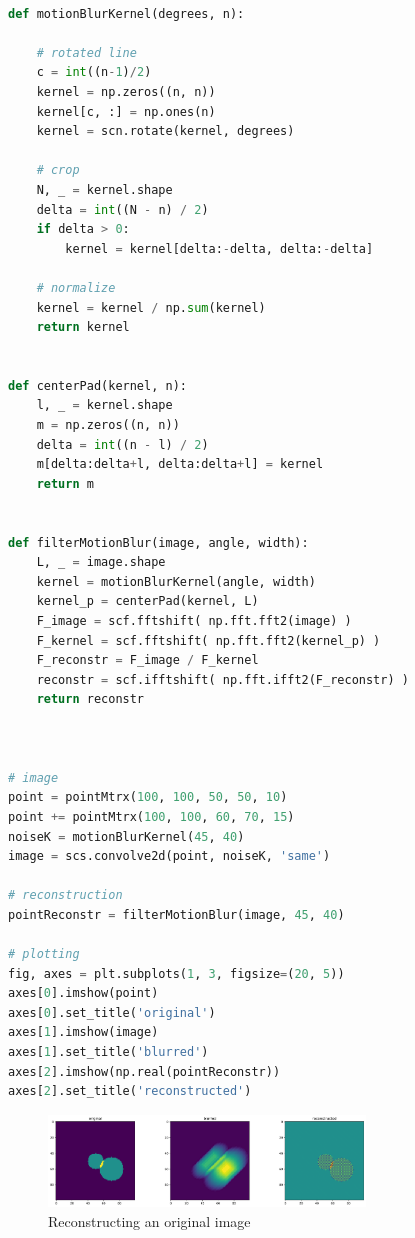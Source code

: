 \begin{lstlisting}[language=python]

def motionBlurKernel(degrees, n):

    # rotated line
    c = int((n-1)/2)
    kernel = np.zeros((n, n))
    kernel[c, :] = np.ones(n)
    kernel = scn.rotate(kernel, degrees)

    # crop
    N, _ = kernel.shape
    delta = int((N - n) / 2)
    if delta > 0:
        kernel = kernel[delta:-delta, delta:-delta]
    
    # normalize
    kernel = kernel / np.sum(kernel)
    return kernel


def centerPad(kernel, n):
    l, _ = kernel.shape
    m = np.zeros((n, n))
    delta = int((n - l) / 2)
    m[delta:delta+l, delta:delta+l] = kernel
    return m


def filterMotionBlur(image, angle, width):
    L, _ = image.shape
    kernel = motionBlurKernel(angle, width)
    kernel_p = centerPad(kernel, L)
    F_image = scf.fftshift( np.fft.fft2(image) )
    F_kernel = scf.fftshift( np.fft.fft2(kernel_p) )
    F_reconstr = F_image / F_kernel
    reconstr = scf.ifftshift( np.fft.ifft2(F_reconstr) )
    return reconstr



# image
point = pointMtrx(100, 100, 50, 50, 10)
point += pointMtrx(100, 100, 60, 70, 15)
noiseK = motionBlurKernel(45, 40)
image = scs.convolve2d(point, noiseK, 'same')

# reconstruction
pointReconstr = filterMotionBlur(image, 45, 40)

# plotting
fig, axes = plt.subplots(1, 3, figsize=(20, 5))
axes[0].imshow(point)
axes[0].set_title('original')
axes[1].imshow(image)
axes[1].set_title('blurred')
axes[2].imshow(np.real(pointReconstr))
axes[2].set_title('reconstructed')
\end{lstlisting}

\begin{figure}[H]
    \caption{Reconstructing an original image}
    \centering
      \includegraphics[width=0.75\textwidth]{images/deconvolution.png}
  \end{figure}

